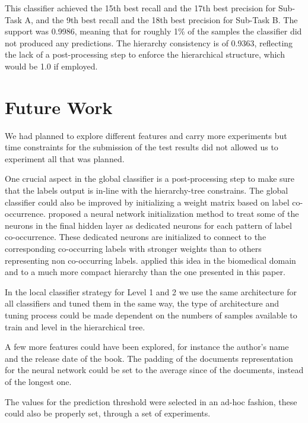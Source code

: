 \documentclass[11pt,a4paper]{article}
\begin{document}
This classifier achieved the 15th best recall and the 17th best precision
for Sub-Task A, and the 9th best recall and the 18th best precision for Sub-Task B.
The support was 0.9986, meaning that for roughly 1\% of the samples the classifier
did not produced any predictions. The hierarchy consistency is of 0.9363, reflecting
the lack of a post-processing step to enforce the hierarchical structure,
which would be 1.0 if employed.

\section{Future Work}\label{future}

We had planned to explore different features and carry more experiments but time
constraints for the submission of the test results did not allowed us to experiment
all that was planned.

One crucial aspect in the global classifier is a post-processing step to make
sure that the labels output is in-line with the hierarchy-tree constrains. The
global classifier could also be improved by initializing a weight matrix
based on label co-occurrence. \citet{kurata-etal-2016-improved} proposed a neural
network initialization method to treat some of the neurons in the final hidden
layer as dedicated neurons for each pattern of label co-occurrence. These dedicated
neurons are initialized to connect to the corresponding co-occurring labels with
stronger weights than to others representing non co-occurring labels. \citet{baker-korhonen-2017-initializing}
applied this idea in the biomedical domain and to a much more compact hierarchy
than the one presented in this paper.


In the local classifier strategy for Level 1 and 2 we use the same architecture
for all classifiers and tuned them in the same way, the type of architecture and
tuning process could be made dependent on the numbers of samples available to
train and level in the hierarchical tree.

A few more features could have been explored, for instance the author's name
and the release date of the book. The padding of the documents representation
for the neural network could be set to the average since of the documents,
instead of the longest one.

The values for the prediction threshold were selected in an ad-hoc fashion, these
could also be properly set, through a set of experiments.





\end{document}
